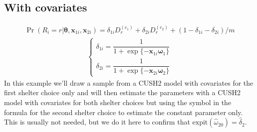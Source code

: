 \documentclass[letterpaper,10pt,english]{sphinxmanual}
\begin{document}
\subsection{With covariates}
\label{\detokenize{manual:id157}}\begin{equation*}
\begin{split}\Pr(R_i=r|\pmb\theta,\pmb x_{1i}, \pmb x_{2i}) = \delta_{1i} D_r^{(c_1)} + \delta_{2i} D_r^{(c_2)} + (1-\delta_{1i}- \delta_{2i})/m\end{split}
\end{equation*}\begin{equation*}
\begin{split}\left\{
\begin{array}{l}
    \delta_{1i} = \dfrac{1}{1+\exp\{ - \pmb x_{1i} \pmb\omega_1 \}}
    \\
    \delta_{2i} = \dfrac{1}{1+\exp\{ - \pmb x_{2i} \pmb\omega_2 \}}
\end{array}
\right.\end{split}
\end{equation*}
\sphinxAtStartPar
In this example we’ll draw a sample from a CUSH2 model with
covariates for the first shelter choice only and will then
estimate the parameters with a CUSH2 model with covariates
for both shelter choices but using the symbol  in the
formula for the second shelter choice to estimate the
constant parameter only. This is usually not needed, but
we do it here to confirm that \(\mathrm{expit}(\hat\omega_{20})=\hat\delta_2\).
\end{document}
